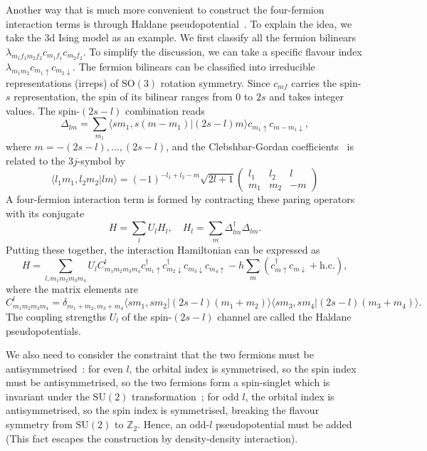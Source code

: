 \documentclass{timesjhep}
\begin{document}
Another way that is much more convenient to construct the four-fermion interaction terms is through Haldane pseudopotential~\cite{Haldane1983LLL,Trugman1985Pseudo}. To explain the idea, we take the 3d Ising model as an example. We first classify all the fermion bilinears $\lambda_{m_1f_1m_2f_2}c_{m_1f_1}c_{m_2f_2}$. To simplify the discussion, we can take a specific flavour index $\lambda_{m_1m_2}c_{m_1\uparrow}c_{m_2\downarrow}$. The fermion bilinears can be classified into irreducible representations (irreps) of $\mathrm{SO}(3)$ rotation symmetry. Since $c_{mf}$ carries the spin-$s$ representation, the spin of its bilinear ranges from $0$ to $2s$ and takes integer values. The spin-$(2s-l)$ combination reads
\begin{equation}
    \Delta_{lm}=\sum_{m_1}\langle sm_1,s(m-m_1)|(2s-l)m\rangle c_{m_1\uparrow}c_{m-m_1\downarrow},
    \label{eq:ising_pair}
\end{equation}
where $m=-(2s-l),\dots,(2s-l)$, and the Clebshbar-Gordan coefficients~\cite{Biedenharn1984Angular} is related to the $3j$-symbol by
\begin{equation}
    \langle l_1m_1,l_2m_2|lm\rangle=(-1)^{-l_1+l_2-m}\sqrt{2l+1}\begin{pmatrix}l_1&l_2&l\\m_1&m_2&-m\end{pmatrix}
\end{equation}
A four-fermion interaction term is formed by contracting these paring operators with its conjugate
\begin{equation}
    H=\sum_lU_lH_l,\quad H_l=\sum_m\Delta_{lm}^\dagger\Delta_{lm}.
\end{equation}
Putting these together, the interaction Hamiltonian can be expressed as
\begin{equation}
    H=\sum_{l,m_1m_2m_3m_4}U_lC^l_{m_1m_2m_3m_4}c^\dagger_{m_1\uparrow}c^\dagger_{m_2\downarrow}c_{m_3\downarrow}c_{m_4\uparrow}-h\sum_m(c_{m\uparrow}^\dagger c_{m\downarrow}+\textrm{h.c.}),
\end{equation}
where the matrix elements are
\begin{equation}
    C^l_{m_1m_2m_3m_4}=\delta_{m_1+m_2,m_3+m_4}\langle sm_1,sm_2|(2s-l)(m_1+m_2)\rangle\langle sm_3,sm_4|(2s-l)(m_3+m_4)\rangle.
    \label{eq:ps_pot_coeff}
\end{equation}
The coupling strengths $U_l$ of the spin-$(2s-l)$ channel are called the Haldane pseudopotentials.

We also need to consider the constraint that the two fermions must be antisymmetrised~: for even $l$, the orbital index is symmetrised, so the spin index must be antisymmetrised, so the two fermions form a spin-singlet which is invariant under the $\mathrm{SU}(2)$ transformation~; for odd $l$, the orbital index is antisymmetrised, so the spin index is symmetrised, breaking the flavour symmetry from $\mathrm{SU}(2)$ to $\mathbb{Z}_2$. Hence, an odd-$l$ pseudopotential must be added (This fact escapes the construction by density-density interaction).
\end{document}
